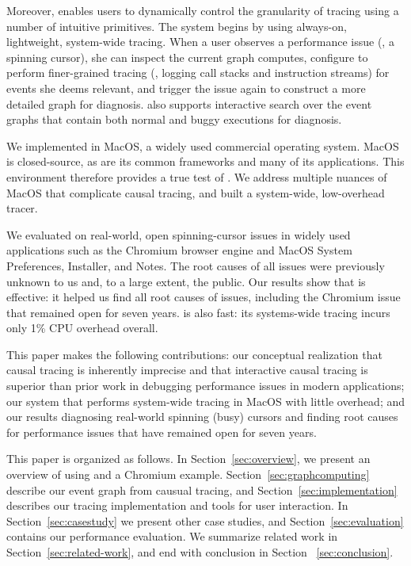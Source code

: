 Moreover, \xxx enables users to dynamically control the granularity of tracing
using a number of intuitive primitives. The system begins by using always-on,
lightweight, system-wide tracing.  When a user observes a performance issue
(\eg, a spinning cursor), she can inspect the current graph \xxx computes,
configure \xxx to perform finer-grained tracing (\eg, logging call stacks and
instruction streams) for events she deems relevant, and trigger the issue again
to construct a more detailed graph for diagnosis.  \xxx also supports
interactive search over the event graphs that contain both normal and buggy
executions for diagnosis.

We implemented \xxx in MacOS, a widely used commercial operating system. MacOS
is closed-source, as are its common frameworks and many of its applications.
This environment therefore provides a true test of \xxx.  We address multiple
nuances of MacOS that complicate causal tracing, and built a system-wide,
low-overhead tracer.

We evaluated \xxx on \nbug real-world, open spinning-cursor issues in widely
used applications such as the Chromium browser engine and MacOS System
Preferences, Installer, and Notes.  The root causes of all \nbug issues were
previously unknown to us and, to a large extent, the public. Our results show
that \xxx is effective: it helped us find all root causes of issues, including
the Chromium issue that remained open for seven years.  \xxx is also fast: its
systems-wide tracing incurs only 1\% CPU overhead overall.

This paper makes the following contributions: our conceptual realization that
causal tracing is inherently imprecise and that interactive causal tracing is
superior than prior work in debugging performance issues in modern
applications; our system \xxx that performs system-wide tracing in MacOS with
little overhead; and our results diagnosing real-world spinning (busy) cursors
and finding root causes for performance issues that have remained open for
seven years.

This paper is organized as follows. In Section~\ref{sec:overview}, we present
an overview of using \xxx and a Chromium example.
Section~\ref{sec:graphcomputing} describe our event graph from causual tracing,
and Section~\ref{sec:implementation} describes our
tracing implementation and tools for user interaction.
In Section~\ref{sec:casestudy} we present other case
studies, and Section~\ref{sec:evaluation} contains our performance evaluation.
We summarize related work in Section~\ref{sec:related-work}, and end with
conclusion in Section ~\ref{sec:conclusion}.
